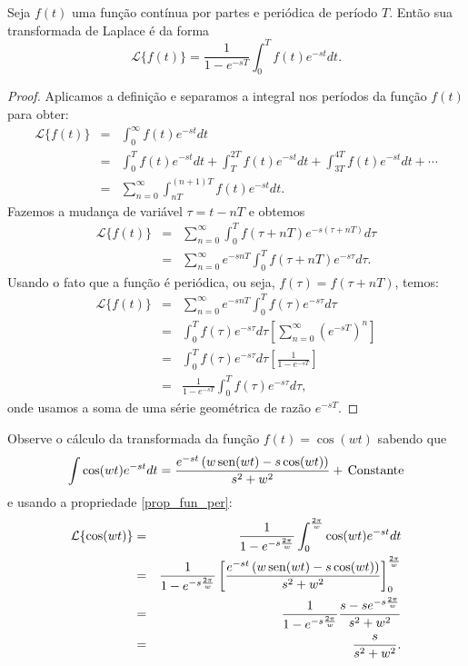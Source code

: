 \begin{propr}{\label{prop_fun_per}}Seja $f(t)$ uma função contínua por partes e periódica de período $T$. Então sua transformada de Laplace é da forma
$$
\mathcal{L}\{f(t)\}=\frac{1}{1-e^{-sT}}\int_0^Tf(t)e^{-st}dt.
$$
\end{propr}
\begin{proof}Aplicamos a definição e separamos a integral nos períodos da função $f(t)$ para obter:
\begin{eqnarray*}
 \mathcal{L}\{f(t)\}&=&\int_0^\infty f(t)e^{-st}dt \\
 &=&\int_0^T f(t)e^{-st}dt+\int_T^{2T} f(t)e^{-st}dt+\int_{3T}^{4T} f(t)e^{-st}dt+\cdots\\
 &=&\sum_{n=0}^\infty \int_{nT}^{(n+1)T} f(t)e^{-st}dt.
\end{eqnarray*}
Fazemos a mudança de variável $\tau=t-nT$ e obtemos
 \begin{eqnarray*}
 \mathcal{L}\{f(t)\}&=&\sum_{n=0}^\infty \int_{0}^{T} f(\tau+nT)e^{-s(\tau+nT)}d\tau\\
 &=&\sum_{n=0}^\infty e^{-snT} \int_{0}^{T} f(\tau+nT)e^{-s\tau}d\tau.
 \end{eqnarray*}
 Usando o fato que a função é periódica, ou seja, $f(\tau)=f(\tau+nT)$, temos:
 \begin{eqnarray*}
  \mathcal{L}\{f(t)\}&=&\sum_{n=0}^\infty e^{-snT} \int_{0}^{T} f(\tau)e^{-s\tau}d\tau\\
 &=&\int_{0}^{T} f(\tau)e^{-s\tau}d\tau\left[\sum_{n=0}^\infty \left(e^{-sT}\right)^n \right]\\
 &=&\int_{0}^{T} f(\tau)e^{-s\tau}d\tau\left[\frac{1}{1-e^{-sT}} \right]\\
 &=&\frac{1}{1-e^{-sT}}\int_{0}^{T} f(\tau)e^{-s\tau}d\tau,
\end{eqnarray*}
onde usamos a soma de uma série geométrica de razão $e^{-sT}$.
 \end{proof}
\begin{ex}Observe o cálculo da transformada da função $f(t)=\cos(wt)$ sabendo que
$$
\int \cos(wt)e^{-st}dt=\frac{e^{-st}\left(w\sen(wt)-s\cos(wt)\right)}{s^2+w^2}+\ \!\hbox{Constante}
$$
e usando a propriedade \ref{prop_fun_per}:
\begin{eqnarray*} 
\mathcal{L}\{\cos(wt)\}&=&\frac{1}{1-e^{-s\frac{2\pi }{w}}}\int_0^{\frac{2\pi }{w}}\cos(wt)e^{-st}dt\\
&=&\frac{1}{1-e^{-s\frac{2\pi }{w}}}\left[\frac{e^{-st}\left(w\operatorname{sen}(wt)-s\cos(wt)\right)}{s^2+w^2}\right]_0^{\frac{2\pi }{w}}\\
&=&\frac{1}{1-e^{-s\frac{2\pi }{w}}}\frac{s-se^{-s\frac{2\pi }{w}}}{s^2+w^2}\\
&=&\frac{s}{s^2+w^2}.
\end{eqnarray*}
 
\end{ex}
